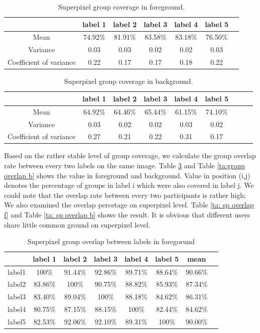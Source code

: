 \documentclass[runningheads,a4paper]{llncs}
\begin{document}
\begin{table}[!tb]
\centering
\caption{Superpixel group coverage in foreground.}
\begin{tabular}{|c|c|c|c|c|c|c|}
\hline
 & label 1 & label 2&label 3&label 4&label 5\\
\hline
Mean& 74.92\% & 81.91\% & 83.58\%& 83.18\%& 76.50\%\\
\hline
Variance& 0.03 & 0.03& 0.02& 0.02& 0.03 \\
\hline
Coefficient of variance& 0.22 & 0.17 & 0.17& 0.18& 0.22 \\
\hline
\end{tabular}
\label{ta: label coverage f}
\end{table}

\begin{table}[!tb]
\centering
\caption{Superpixel group coverage in background.}
\begin{tabular}{|c|c|c|c|c|c|c|c|c|}
\hline
 & label 1 & label 2&label 3&label 4&label 5 \\
\hline
Mean& 64.92\% & 64.46\% & 65.44\%& 61.15\%& 74.10\% \\
\hline
Variance& 0.03 & 0.02 & 0.02& 0.03& 0.02 \\
\hline
Coefficient of variance& 0.27 & 0.21& 0.22& 0.31& 0.17 \\
\hline
\end{tabular}
\label{ta: label coverage b}
\end{table}


Based on the rather stable level of group coverage, we calculate the group overlap rate between every two labels on the same image. Table \ref{ta:group overlap f} and Table \ref{ta:group overlap b}  shows the value in foreground and background. Value in position (i,j) denotes the percentage of groups in label i which were also covered in label j. We could note that the overlap rate between every two participants is rather high; We also examined the overlap percetage on superpixel level. Table \ref{ta: sp overlap f} and Table \ref{ta: sp overlap b} shows the result. It is obvious that different users share little common ground on superpixel level.

\begin{table}[!tb]
\centering
\begin{tabular}{|c|c|c|c|c|c|c|c|}
\hline
 & label 1 & label 2&label 3&label 4&label 5&mean\\
\hline
label1& 100\% & 91.44\% & 92.86\%& 89.71\%& 88.64\%&90.66\%\\
\hline
label2& 83.86\% & 100\% & 90.75\%& 88.82\%& 85.93\%&87.34\%\\
\hline
label3& 83.40\% & 89.04\% & 100\%& 88.18\%& 84.62\%&86.31\% \\
\hline
label4& 80.75\% & 87.15\% & 88.15\%& 100\%& 82.44\%&84.62\% \\
\hline
label5& 82.53\% & 92.06\% & 92.10\%& 89.31\%& 100\%&90.00\% \\
\hline
\end{tabular}
\captionsetup{justification=centerlast}
\caption{Superpixel group overlap between labels in foregorund}
\label{ta:group overlap f}
\end{table}
\end{document}
